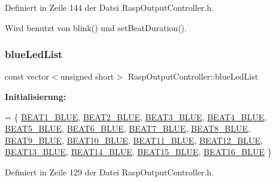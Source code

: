 Definiert in Zeile 144 der Datei Rasp\+Output\+Controller.\+h.



Wird benutzt von blink() und set\+Beat\+Duration().

\mbox{\label{class_rasp_output_controller_a9b5e5c4ee94d43d62e41961e6c8bea3b}} 
\subsubsection{\texorpdfstring{blue\+Led\+List}{blueLedList}}
{\footnotesize\ttfamily const vector$<$unsigned short$>$ Rasp\+Output\+Controller\+::blue\+Led\+List\hspace{0.3cm}{\ttfamily [private]}}

{\bfseries Initialisierung\+:}
\begin{DoxyCode}
= \{
            \hyperlink{namespaceoutputs_a7c39d2e5116c2502c2b90bf1e8be5520}{BEAT1\_BLUE}, \hyperlink{namespaceoutputs_ac6bffee9716f79b218c8fb366351032e}{BEAT2\_BLUE}, \hyperlink{namespaceoutputs_ae87166c20e497c5b092a92bc98da94c2}{BEAT3\_BLUE}, 
      \hyperlink{namespaceoutputs_aa66f074e1960dc7dbf507acdf6cc5ae3}{BEAT4\_BLUE}, \hyperlink{namespaceoutputs_a0fab71f89a857d67f1329fbd097046ae}{BEAT5\_BLUE}, \hyperlink{namespaceoutputs_a1981eea86b118b5ff49c09ee50a75221}{BEAT6\_BLUE}, \hyperlink{namespaceoutputs_a7051f5db20e6f0c0dc7dad8775d21b1f}{BEAT7\_BLUE}, 
      \hyperlink{namespaceoutputs_a29cf0b90cc4df367e62aaaa86e7ed24e}{BEAT8\_BLUE}, \hyperlink{namespaceoutputs_a1f88716cbf83123bc10bd31b07f86b4c}{BEAT9\_BLUE},
            \hyperlink{namespaceoutputs_a188668f7db5d9610361658c817b08574}{BEAT10\_BLUE}, \hyperlink{namespaceoutputs_a31d60b8c00551d3dbeca8645eba200eb}{BEAT11\_BLUE}, \hyperlink{namespaceoutputs_ae7b144325945c1712151bf0d6a363c5f}{BEAT12\_BLUE}, 
      \hyperlink{namespaceoutputs_a38a0eba17cc5ed8eed42c37dca1feb3f}{BEAT13\_BLUE}, \hyperlink{namespaceoutputs_ab384095ae250cb117a95683710620188}{BEAT14\_BLUE}, \hyperlink{namespaceoutputs_a6d12c95904da18827ed262896b9ebaa1}{BEAT15\_BLUE}, 
      \hyperlink{namespaceoutputs_aaa4685feacdb3e8d2bb1c0435952e030}{BEAT16\_BLUE}
    \}
\end{DoxyCode}


Definiert in Zeile 129 der Datei Rasp\+Output\+Controller.\+h.

